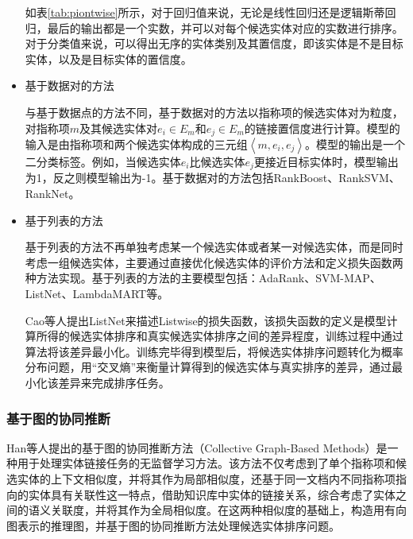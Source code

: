 \begin{itemize}
{	如表\ref{tab:piontwise}所示，对于回归值来说，无论是线性回归还是逻辑斯蒂回归，最后的输出都是一个实数，并可以对每个候选实体对应的实数进行排序。对于分类值来说，可以得出无序的实体类别及其置信度，即该实体是不是目标实体，以及是目标实体的置信度。
	}
	\item {基于数据对的方法
		
		与基于数据点的方法不同，基于数据对的方法以指称项的候选实体对为粒度，对指称项$m$及其候选实体对$e_i\in E_m$和$e_j\in E_m$的链接置信度进行计算。模型的输入是由指称项和两个候选实体构成的三元组$\left\langle m,e_i,e_j\right\rangle $。模型的输出是一个二分类标签。例如，当候选实体$e_i$比候选实体$e_j$更接近目标实体时，模型输出为1，反之则模型输出为-1。基于数据对的方法包括RankBoost\cite{AMIRSBOR}、RankSVM\cite{ESLRES}、RankNet\cite{ADRFPS}。
		
	}
	\item {基于列表的方法
		
		基于列表的方法不再单独考虑某一个候选实体或者某一对候选实体，而是同时考虑一组候选实体，主要通过直接优化候选实体的评价方法和定义损失函数两种方法实现。基于列表的方法的主要模型包括：AdaRank\cite{xu2007adarank}、SVM-MAP\cite{yue2007support}、ListNet\cite{LTRFPATLA}、LambdaMART\cite{burges2010ranknet}等。
		
		Cao等人\cite{LTRFPATLA}提出ListNet来描述Listwise的损失函数，该损失函数的定义是模型计算所得的候选实体排序和真实候选实体排序之间的差异程度，训练过程中通过算法将该差异最小化。训练完毕得到模型后，将候选实体排序问题转化为概率分布问题，用“交叉熵”来衡量计算得到的候选实体与真实排序的差异，通过最小化该差异来完成排序任务。
	}
\end{itemize}

\subsubsection{基于图的协同推断}
Han等人\cite{CELWTGBM}提出的基于图的协同推断方法（Collective Graph-Based Methods）是一种用于处理实体链接任务的无监督学习方法。该方法不仅考虑到了单个指称项和候选实体的上下文相似度，并将其作为局部相似度，还基于同一文档内不同指称项指向的实体具有关联性这一特点，借助知识库中实体的链接关系，综合考虑了实体之间的语义关联度，并将其作为全局相似度。在这两种相似度的基础上，构造用有向图表示的推理图，并基于图的协同推断方法处理候选实体排序问题。

